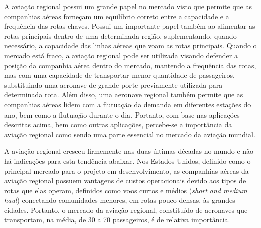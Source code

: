 A aviação regional possui um grande papel no mercado visto que permite que as companhias aéreas forneçam um equilíbrio correto entre a capacidade e a frequência das rotas chaves. Possui um importante papel também ao alimentar as rotas principais dentro de uma determinada região, suplementando, quando necessário, a capacidade das linhas aéreas que voam as rotas principais. Quando o mercado está fraco, a aviação regional pode ser utilizada visando defender a posição da companhia aérea dentro do mercado, mantendo a frequência das rotas, mas com uma capacidade de transportar menor quantidade de passageiros, substituindo uma aeronave de grande porte previamente utilizada para determinada rota. Além disso, uma aeronave regional também permite que as companhias aéreas lidem com a flutuação da demanda em diferentes estações do ano, bem como a flutuação durante o dia. Portanto, com base nas aplicações descritas acima, bem como outras aplicações, percebe-se a importância da aviação regional como sendo uma parte essencial no mercado da aviação mundial.

A aviação regional cresceu firmemente nas duas últimas décadas no mundo e não há indicações para esta tendência abaixar.  Nos Estados Unidos, definido como o principal mercado para o projeto em desenvolvimento, as companhias aéreas da aviação regional possuem vantagens de custos operacionais devido aos tipos de rotas que elas operam, definidos como voos curtos e médios (\emph{short and medium haul}) conectando comunidades menores, em rotas pouco densas, às grandes cidades. Portanto, o mercado da aviação regional, constituído de aeronaves que transportam, na média, de 30 a 70 passageiros, é de relativa importância. 


